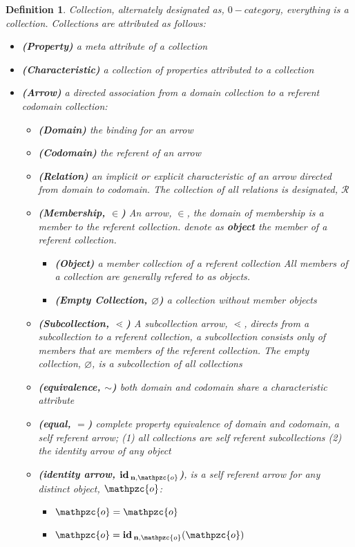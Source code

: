 \documentclass[aps,twocolumn,secnumarabic,nobalancelastpage,amsmath,amssymb,
amsthm,nofootinbib,parskip=full]{revtex4}
\numberwithin{equation}{section}
\newtheorem{definition}{Definition}[section]
\newcommand{\subp}[1]{\mathbf{#1}}
\newcommand{\obk}[1]{\mathpzc{#1}}
\newcommand{\oarrid}[2]{\oper{id}_{\subp{#1},\obk{#2}}}
\newcommand{\oper}[1]{\mathbf{#1}\,}
\begin{document}
\begin{definition}{Collection}\label{def:collection},
  alternately designated as, $0-category$, everything is a collection.
  Collections are attributed as follows:
  \begin{itemize}
  \item\textbf{(Property)} a meta attribute of a collection
  \item\textbf{(Characteristic)} a collection of properties
    attributed to a collection
  \item\textbf{(Arrow)} a directed association from a domain
    collection to a referent codomain collection:
    \begin{itemize}
    \item\textbf{(Domain)} the binding for an arrow
    \item\textbf{(Codomain)} the referent of an arrow
    \item\textbf{(Relation)} an implicit or explicit
      characteristic of an arrow directed from domain to codomain.
      The collection of all relations is designated, $\mathcal{R}$
    \item\textbf{(Membership, $\in$)} An arrow, $\in$, the domain of
      membership is a member to the referent collection. denote as
      {\bf object} the member of a referent collection.
      \begin{itemize}
      \item\textbf{(Object)} a member collection of a referent collection
      All members of a collection are generally refered to as objects.
      \item\textbf{(Empty Collection, $\varnothing$)} a collection without
      member objects
      \end{itemize}
    \item\textbf{(Subcollection, $\lessdot$)} A subcollection
      arrow, $\lessdot$, directs from a subcollection to a referent collection,
      a subcollection consists only of members that are members of the
      referent collection. The empty collection, $\varnothing$, is a
      subcollection of all collections
    \item\textbf{(equivalence, $\sim$)} both domain and codomain
      share a characteristic attribute
    \item\textbf{(equal, $=$)} complete property equivalence of
      domain and codomain,
      a self referent arrow; (1) all collections are self
      referent subcollections (2) the identity arrow of any object
    \item\textbf{(identity arrow, $\oarrid{n}{o}$)}, is a self referent
      arrow for any distinct object, $\obk{o}$:
    \begin{itemize}
      \item $\obk{o}=\obk{o}$
      \item $\obk{o}=\oarrid{n}{o}(\obk{o})$
    \end{itemize}
    \end{itemize}
  \end{itemize}
\end{definition}
\end{document}
